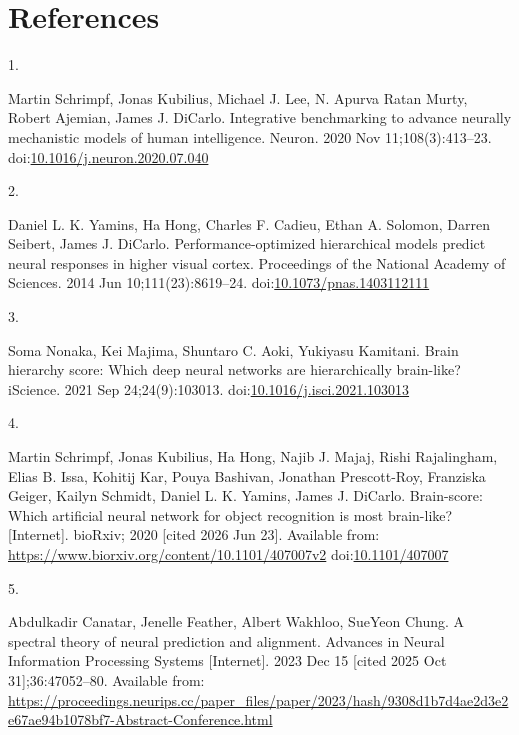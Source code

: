 \documentclass[
  11pt,
  letterpaper,
  DIV=11,
  numbers=noendperiod]{scrartcl}
\newlength{\cslhangindent}
\newlength{\csllabelwidth}
\newenvironment{CSLReferences}[2] %
 {\begin{list}{}{%
  \setlength{\itemindent}{0pt}
  \setlength{\leftmargin}{0pt}
  \setlength{\parsep}{0pt}
  \ifodd #1
   \setlength{\leftmargin}{\cslhangindent}
   \setlength{\itemindent}{-1\cslhangindent}
  \fi
  \setlength{\itemsep}{#2\baselineskip}}}
 {\end{list}}
\newcommand{\CSLLeftMargin}[1]{\parbox[t]{\csllabelwidth}{\strut#1\strut}}
\newcommand{\CSLRightInline}[1]{\parbox[t]{\linewidth - \csllabelwidth}{\strut#1\strut}}
\begin{document}
\newpage{}

\section{References}\label{references}

\label{refs}
\begin{CSLReferences}{0}{1}
\CSLLeftMargin{1. }%
\CSLRightInline{Martin Schrimpf, Jonas Kubilius, Michael J. Lee, N.
Apurva Ratan Murty, Robert Ajemian, James J. DiCarlo. Integrative
benchmarking to advance neurally mechanistic models of human
intelligence. Neuron. 2020 Nov 11;108(3):413--23.
doi:\href{https://doi.org/10.1016/j.neuron.2020.07.040}{10.1016/j.neuron.2020.07.040}}

\CSLLeftMargin{2. }%
\CSLRightInline{Daniel L. K. Yamins, Ha Hong, Charles F. Cadieu, Ethan
A. Solomon, Darren Seibert, James J. DiCarlo. Performance-optimized
hierarchical models predict neural responses in higher visual cortex.
Proceedings of the National Academy of Sciences. 2014 Jun
10;111(23):8619--24.
doi:\href{https://doi.org/10.1073/pnas.1403112111}{10.1073/pnas.1403112111}}

\CSLLeftMargin{3. }%
\CSLRightInline{Soma Nonaka, Kei Majima, Shuntaro C. Aoki, Yukiyasu
Kamitani. Brain hierarchy score: Which deep neural networks are
hierarchically brain-like? {iScience}. 2021 Sep 24;24(9):103013.
doi:\href{https://doi.org/10.1016/j.isci.2021.103013}{10.1016/j.isci.2021.103013}}

\CSLLeftMargin{4. }%
\CSLRightInline{Martin Schrimpf, Jonas Kubilius, Ha Hong, Najib J.
Majaj, Rishi Rajalingham, Elias B. Issa, Kohitij Kar, Pouya Bashivan,
Jonathan Prescott-Roy, Franziska Geiger, Kailyn Schmidt, Daniel L. K.
Yamins, James J. DiCarlo. Brain-score: Which artificial neural network
for object recognition is most brain-like? {[}Internet{]}. {bioRxiv};
2020 {[}cited 2026 Jun 23{]}. Available from:
\url{https://www.biorxiv.org/content/10.1101/407007v2}
doi:\href{https://doi.org/10.1101/407007}{10.1101/407007}}

\CSLLeftMargin{5. }%
\CSLRightInline{Abdulkadir Canatar, Jenelle Feather, Albert Wakhloo,
SueYeon Chung. A spectral theory of neural prediction and alignment.
Advances in Neural Information Processing Systems {[}Internet{]}. 2023
Dec 15 {[}cited 2025 Oct 31{]};36:47052--80. Available from:
\url{https://proceedings.neurips.cc/paper_files/paper/2023/hash/9308d1b7d4ae2d3e2e67ae94b1078bf7-Abstract-Conference.html}}


\end{CSLReferences}
\end{document}
